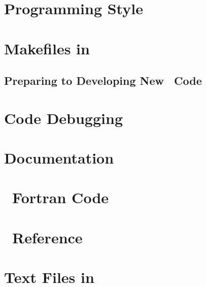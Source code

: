 \documentclass[12pt]{article}
\begin{document}
\section{Programming Style}\label{Style}


\section{Makefiles in \PSIthree}\label{Makefiles}


\subsection{Preparing to Developing New \PSIthree\ Code}\label{New_Code}


\section{Code Debugging}\label{Debugging}


\section{Documentation}\label{Documentation}


\newpage
\appendix

\section{\PSIthree\ Fortran Code}\label{PSI_Fortran}


\section{\PSIthree\ Reference}\label{PSI_Reference}


\section{Text Files in \PSIthree}\label{Text_files}


%
\end{document}
